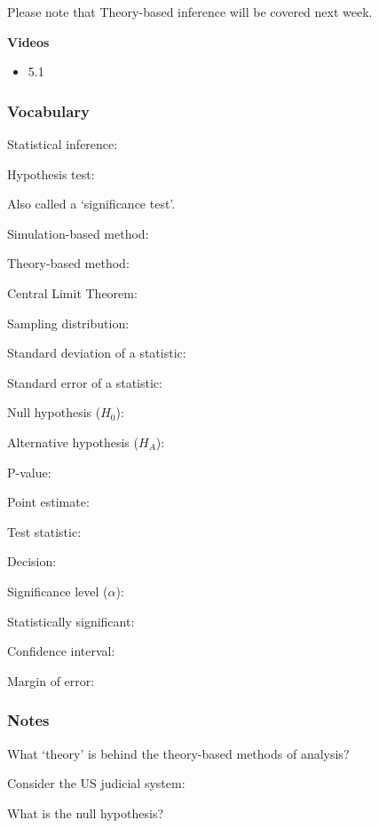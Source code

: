 \documentclass[
]{report}
\providecommand{\tightlist}{%
  \setlength{\itemsep}{0pt}\setlength{\parskip}{0pt}}
\newcommand{\rgs}{\vspace{12pt}} %
\newcommand{\rgi}{\hspace{24pt}}  %
\begin{document}
Please note that Theory-based inference will be covered next week.

\textbf{Videos}

\begin{itemize}
\tightlist
\item
  5.1
\end{itemize}


\hypertarget{vocabulary}{%
\subsubsection*{Vocabulary}\label{vocabulary}}

Statistical inference:
\rgs

Hypothesis test:

\rgi Also called a `significance test'.
\rgs

Simulation-based method:
\rgs

Theory-based method:
\rgs

Central Limit Theorem:
\rgs

Sampling distribution:
\rgs

Standard deviation of a statistic:
\rgs

Standard error of a statistic:
\rgs

Null hypothesis (\(H_0\)):
\rgs

Alternative hypothesis (\(H_A\)):
\rgs

P-value:
\rgs

Point estimate:
\rgs

Test statistic:
\rgs

Decision:
\rgs

Significance level (\(\alpha\)):
\rgs 

Statistically significant:
\rgs

Confidence interval:
\rgs

Margin of error:
\rgs

\hypertarget{notes}{%
\subsubsection*{Notes}\label{notes}}

What `theory' is behind the theory-based methods of analysis?
\rgs

Consider the US judicial system:

\rgi What is the null hypothesis?
\rgs
\end{document}
